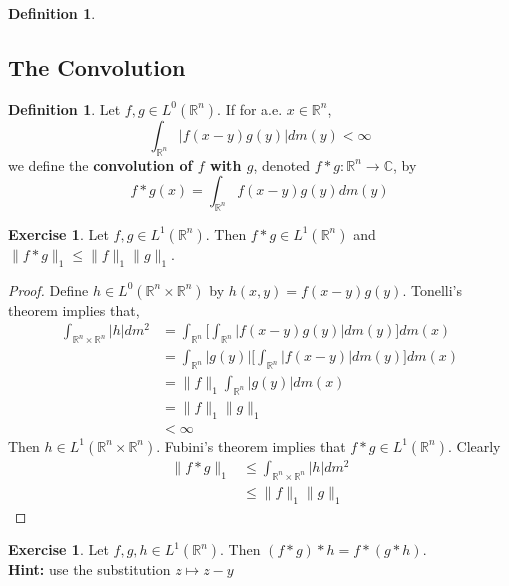 \documentclass[12pt]{amsart}
\theoremstyle{definition}
\newtheorem{defn}[definition]{Definition}
\newtheorem{ex}[definition]{Exercise}
\newcommand{\C}{\mathbb{C}}
\newcommand{\R}{\mathbb{R}}
\newcommand{\lex}[1]{\label{ex:#1}}
\newcommand{\ld}[1]{\label{defn:#1}}
\begin{document}
	\begin{defn}
	
	\end{defn}
	
	
	
	
	
	
	
	
	
	
	
	\newpage
	\subsection{The Convolution}
	\begin{defn}
	\ld{200}Let $f, g \in L^0(\R^n)$. If for a.e. $x \in \R^n$, $$\int_{\R^n} |f(x-y)g(y)| dm(y) < \infty$$  
	we define the \textbf{convolution of $f$ with $g$}, denoted $f * g: \R^n \rightarrow \C$, by $$ f * g(x) = \int_{\R^n} f(x-y)g(y) dm(y)$$
	\end{defn}
	
	\begin{ex}
	\lex{201}Let $f, g \in L^1(\R^n)$. Then $f * g \in L^1(\R^n)$ and $\|f * g\|_1 \leq \|f\|_1 \|g\|_1$. 
	\end{ex}	
	
	\begin{proof}
	Define $h \in L^0(\R^n \times \R^n)$ by $h(x,y) = f(x-y)g(y)$. Tonelli's theorem implies that, 
	\begin{align*}
	\int_{\R^n \times \R^n} |h| dm^2
	&= \int_{\R^n} \bigg[  \int_{\R^n} |f(x-y)g(y)| dm(y) \bigg] dm(x) \\
	&= \int_{\R^n} |g(y)| \bigg[  \int_{\R^n} |f(x-y)| dm(y) \bigg] dm(x) \\
	&=  \|f\|_1 \int_{\R^n} |g(y)| dm(x) \\
	&= \|f\|_1 \|g\|_1\\
	& < \infty
	\end{align*}
	Then $h \in L^1(\R^n \times \R^n)$. Fubini's theorem implies that $f * g \in L^1(\R^n)$. Clearly 
	\begin{align*}
	\|f *g\|_1 
	& \leq \int_{\R^n \times \R^n} |h| dm^2 \\
	& \leq \|f\|_1 \|g\|_1
	\end{align*}
	\end{proof}
	
	
	
	\begin{ex}
	\lex{202} Let $f, g, h \in L^1(\R^n)$. Then $(f * g) * h = f * (g * h)$. \\
	\textbf{Hint:} use the substitution $z \mapsto z-y$
	\end{ex}
	
\end{document}
